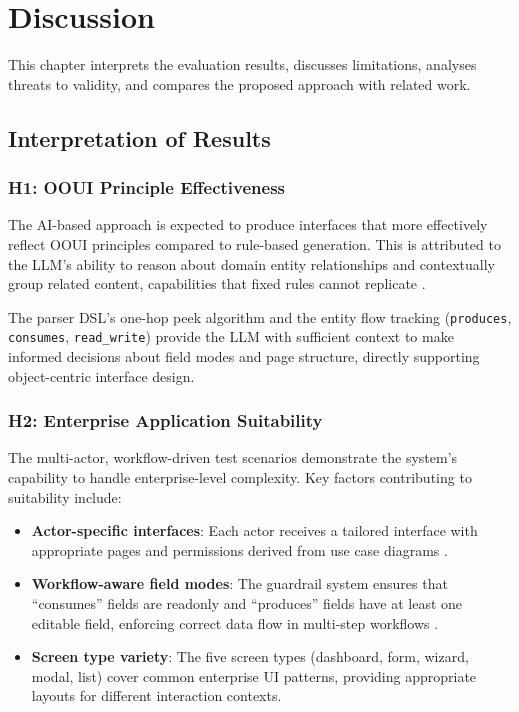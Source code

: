 
\section{Discussion}

This chapter interprets the evaluation results, discusses limitations, analyses threats to validity, and compares the proposed approach with related work.

\subsection{Interpretation of Results}

\subsubsection{H1: OOUI Principle Effectiveness}

The AI-based approach is expected to produce interfaces that more effectively reflect OOUI principles compared to rule-based generation. This is attributed to the LLM's ability to reason about domain entity relationships and contextually group related content, capabilities that fixed rules cannot replicate \cite{Ver25}.

The parser DSL's one-hop peek algorithm and the entity flow tracking (\texttt{produces}, \texttt{consumes}, \texttt{read\_write}) provide the LLM with sufficient context to make informed decisions about field modes and page structure, directly supporting object-centric interface design.

\subsubsection{H2: Enterprise Application Suitability}

The multi-actor, workflow-driven test scenarios demonstrate the system's capability to handle enterprise-level complexity. Key factors contributing to suitability include:

\begin{itemize}
    \item \textbf{Actor-specific interfaces}: Each actor receives a tailored interface with appropriate pages and permissions derived from use case diagrams \cite{Wil24}.
    \item \textbf{Workflow-aware field modes}: The guardrail system ensures that ``consumes'' fields are readonly and ``produces'' fields have at least one editable field, enforcing correct data flow in multi-step workflows \cite{vA22}.
    \item \textbf{Screen type variety}: The five screen types (dashboard, form, wizard, modal, list) cover common enterprise UI patterns, providing appropriate layouts for different interaction contexts.
\end{itemize}

